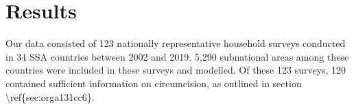 \documentclass{article}
\begin{document}



\section{Results}
\label{sec:orgfc68fc8}


Our data consisted of 123 nationally representative household surveys
conducted in 34 SSA countries between 2002 and 2019. 5,290 subnational
areas among these countries were included in these surveys and modelled.
Of these 123 surveys, 120 contained sufficient information on
circumcision, as outlined in section
\textbackslash ref\{sec:orga131cc6\}.
\end{document}
